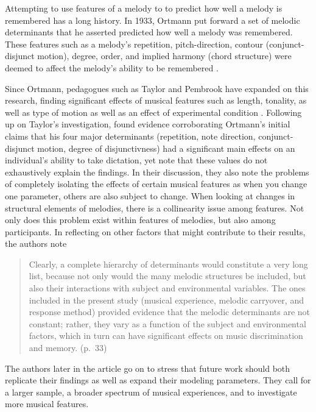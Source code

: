 \documentclass[12pt,]{book}
\begin{document}
Attempting to use features of a melody to to predict how well a melody is remembered has a long history.
In 1933, Ortmann put forward a set of melodic determinants that he asserted predicted how well a melody was remembered.
These features such as a melody's repetition, pitch-direction, contour (conjunct-disjunct motion), degree, order, and implied harmony (chord structure) were deemed to affect the melody's ability to be remembered \citep{ortmannTonalDeterminantsMelodic1933}.

Since Ortmann, pedagogues such as Taylor and Pembrook have expanded on this research, finding significant effects of musical features such as length, tonality, as well as type of motion as well as an effect of experimental condition \citep{taylorStrategiesMemoryShort1983}.
Following up on Taylor's investigation, \citet{pembrookInterferenceTranscriptionProcess1986} found evidence corroborating Ortmann's initial claims that his four major determinants (repetition, note direction, conjunct-disjunct motion, degree of disjunctivness) had a significant main effects on an individual's ability to take dictation, yet note that these values do not exhaustively explain the findings.
In their discussion, they also note the problems of completely isolating the effects of certain musical features as when you change one parameter, others are also subject to change.
When looking at changes in structural elements of melodies, there is a collinearity issue among features.
Not only does this problem exist within features of melodies, but also among participants.
In reflecting on other factors that might contribute to their results, the authors note

\begin{quote}
Clearly, a complete hierarchy of determinants would constitute a very long
list, because not only would the many melodic structures be included, but also
their interactions with subject and environmental variables. The ones included
in the present study (musical experience, melodic carryover, and response
method) provided evidence that the melodic determinants are not constant;
rather, they vary as a function of the subject and environmental factors, which
in turn can have significant effects on music discrimination and memory. (p.~33)
\end{quote}

The authors later in the article go on to stress that future work should both replicate their findings as well as expand their modeling parameters.
They call for a larger sample, a broader spectrum of musical experiences, and to investigate more musical features.
\end{document}
